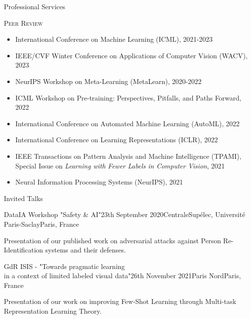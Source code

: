 \documentclass{resume} %
\begin{document}
\begin{rSection}{Professional Services}

\textsc{Peer Review}
\begin{itemize}[label=$\cdot$]
    \item International Conference on Machine Learning (ICML), 2021-2023
    \item IEEE/CVF Winter Conference on Applications of Computer Vision (WACV), 2023
    \item NeurIPS Workshop on Meta-Learning (MetaLearn), 2020-2022
    \item ICML Workshop on Pre-training: Perspectives, Pitfalls, and Paths Forward, 2022
    \item International Conference on Automated Machine Learning (AutoML), 2022
    \item International Conference on Learning Representations (ICLR), 2022
    \item IEEE Transactions on Pattern Analysis and Machine Intelligence (TPAMI), \\ Special Issue on \emph{Learning with Fewer Labels in Computer Vision}, 2021
    \item Neural Information Processing Systems (NeurIPS), 2021
\end{itemize}
    
\end{rSection}
    
    
    \begin{rSection}{Invited Talks}
    
    \begin{rSubsection}{DataIA Workshop "Safety \& AI"}{23th September 2020}{CentraleSupélec, Université Paris-Saclay}{Paris, France}
    \item[] Presentation of our published work on adversarial attacks against Person Re-Identification systems and their defenses.
    \end{rSubsection}

    \begin{rSubsection}{GdR ISIS - "Towards pragmatic learning \\ in a context of limited labeled visual data"}{26th November 2021}{Paris Nord}{Paris, France}
    \item[] Presentation of our work on improving Few-Shot Learning through Multi-task Representation Learning Theory.
    \end{rSubsection}
    
    \end{rSection}
\end{document}
